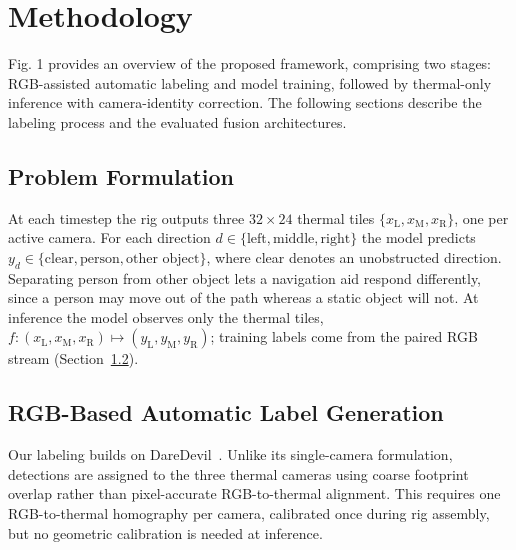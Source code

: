 \section{Methodology}

Fig. 1 provides an overview of the proposed framework, comprising two stages: RGB-assisted automatic labeling and model training, followed by thermal-only inference with camera-identity correction. The following sections describe the labeling process and the evaluated fusion architectures.

\subsection{Problem Formulation}

At each timestep the rig outputs three $32\times24$ thermal tiles
$\{x_{\text{L}}, x_{\text{M}}, x_{\text{R}}\}$, one per active camera. For
each direction $d \in \{\text{left}, \text{middle}, \text{right}\}$ the model
predicts $y_d \in \{\text{clear}, \text{person}, \text{other object}\}$, where
clear denotes an unobstructed direction. Separating person from other object
lets a navigation aid respond differently, since a person may move out of the
path whereas a static object will not. At inference the model observes only
the thermal tiles, $f: (x_{\text{L}}, x_{\text{M}}, x_{\text{R}}) \mapsto
(y_{\text{L}}, y_{\text{M}}, y_{\text{R}})$; training labels come from the
paired RGB stream (Section~\ref{sec:labels}).

\subsection{RGB-Based Automatic Label Generation}
\label{sec:labels}

Our labeling builds on DareDevil~\cite{gaoDeployablePrivacyPreservingThermalBased2025}. Unlike its single-camera formulation, detections are assigned to the three thermal cameras using coarse footprint overlap rather than pixel-accurate RGB-to-thermal alignment. This requires one RGB-to-thermal homography per camera, calibrated once during rig assembly, but no geometric calibration is needed at inference.


